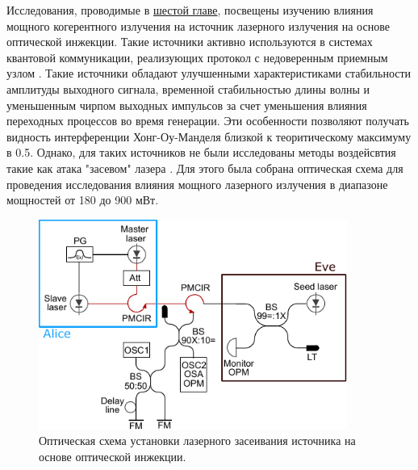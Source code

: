 \newpage Исследования, проводимые в \underline{шестой главе}, посвещены изучению влияния мощного когерентного излучения на источник лазерного излучения на основе оптической инжекции. Такие источники активно используются в системах квантовой коммуникации, реализующих протокол с недоверенным приемным узлом \cite{comandar2016,yuan2016,roberts2018}. Такие источники обладают улучшенными характеристиками стабильности амплитуды выходного сигнала, временной стабильностью длины волны и уменьшенным чирпом выходных импульсов за счет уменьшения влияния переходных процессов во время генерации. Эти особенности позволяют получать видность интерференции Хонг-Оу-Манделя близкой к теоритическому максимуму в 0.5. 
\newline Однако, для таких источников не были исследованы методы воздейсвтия такие как атака "засевом" лазера \cite{fadeev2024a}. Для этого была собрана оптическая схема для проведения исследования влияния мощного лазерного излучения в диапазоне мощностей от 180 до 900 мВт. 
\begin{figure}
    \centering
    \includegraphics[width=0.9\textwidth]{images/setup_Faraday_Mirrors_final.pdf}
    \caption{Оптическая схема установки лазерного засеивания источника на основе оптической инжекции.}
    \label{fig:enter-label}
\end{figure}

